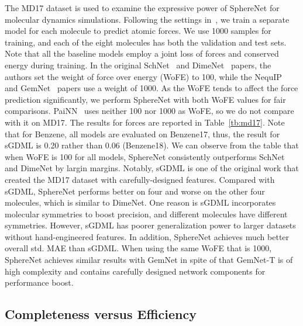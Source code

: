 \documentclass{article}
\begin{document}
The MD17 dataset is used to examine the expressive
power of SphereNet for molecular dynamics simulations.
Following the settings in~\citet{schutt2017schnet,klicpera_dimenet_2020},
we train a separate model for each molecule to predict atomic forces.
We use 1000 samples for training, and each of the eight molecules
has both the validation and test sets.
Note that all the baseline models employ a joint loss of forces and conserved energy
during training.
In the original SchNet~\citep{schutt2017schnet} and DimeNet~\citep{klicpera_dimenet_2020} papers, the authors set the weight of force over energy (WoFE) to 100,
while the NequIP~\citep{batzner2021se} and GemNet~\citep{klicpera2021gemnet} papers use a weight of 1000. As the WoFE tends to affect the force prediction significantly,
we perform SphereNet with both WoFE values for fair comparisons.
PaiNN~\citep{schutt2021equivariant} uses neither 100 nor 1000 as WoFE, so we do not compare with it on MD17.
The results for forces are reported in Table~\ref{tb:md17}.
Note that for Benzene, all models are evaluated on Benzene17,
thus, the result for sGDML is 0.20 rather than 0.06 (Benzene18).
We can observe from the table that when WoFE is 100 for all models, SphereNet consistently outperforms
SchNet and DimeNet by largin margins.
Notably, sGDML is one of the original work that created the MD17 dataset
with carefully-designed features.
Compared with sGDML,
SphereNet performs better on four and worse on the other four molecules, which is similar to DimeNet. One reason is sGDML incorporates molecular symmetries to boost precision, and different molecules have different symmetries. However, sGDML
has poorer generalization power to larger datasets without hand-engineered features.
In addition, SphereNet achieves much better overall std. MAE than sGDML.
When using the same WoFE that is 1000,
SphereNet achieves similar results with GemNet
in spite of that GemNet-T is of high complexity and contains carefully designed network components for performance
boost. 







\subsection{Completeness versus Efficiency}
\end{document}

